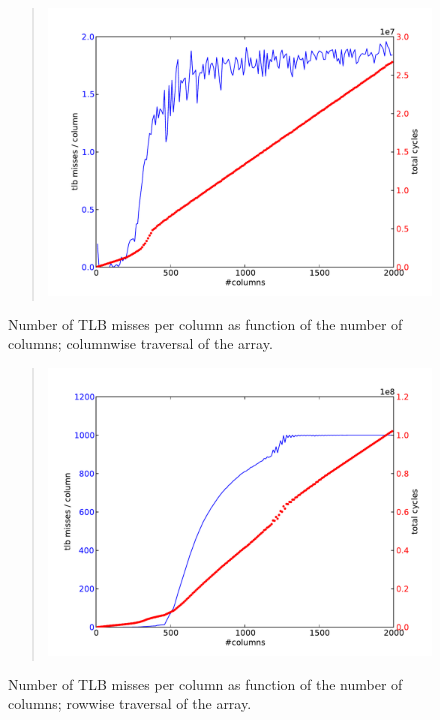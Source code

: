 \begin{figure}
  \begin{quote}
  \includegraphics[scale=.5]{graphics-public/tlb_col}
  \end{quote}
  \caption{Number of TLB misses per column as function of the number
    of columns; columnwise traversal of the array.}
  \label{fig:tlb_col}
\end{figure}
\begin{figure}
  \begin{quote}
  \includegraphics[scale=.5]{graphics-public/tlb_row}
  \end{quote}
  \caption{Number of TLB misses per column as function of the number
    of columns; rowwise traversal of the array.}
  \label{fig:tlb_row}
\end{figure}

